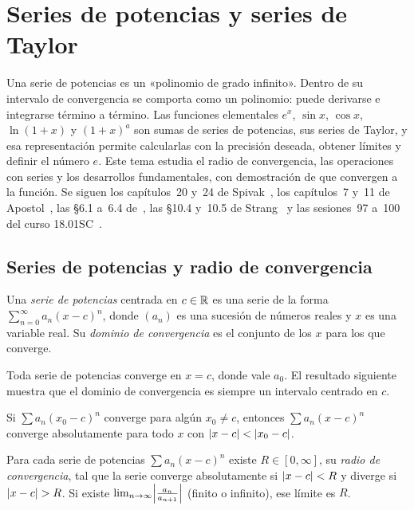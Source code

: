 \chapter{Series de potencias y series de Taylor}
\label{tema:6}

Una serie de potencias es un «polinomio de grado infinito». Dentro de su intervalo de convergencia se comporta como un polinomio: puede derivarse e integrarse término a término. Las funciones elementales $e^{x}$, $\sin x$, $\cos x$, $\ln(1+x)$ y $(1+x)^{a}$ son sumas de series de potencias, sus series de Taylor, y esa representación permite calcularlas con la precisión deseada, obtener límites y definir el número $e$. Este tema estudia el radio de convergencia, las operaciones con series y los desarrollos fundamentales, con demostración de que convergen a la función. Se siguen los capítulos~20 y~24 de Spivak~\cite{spivak}, los capítulos~7 y~11 de Apostol~\cite{apostol}, las §6.1 a~6.4 de~\cite{openstax2}, las §10.4 y~10.5 de Strang~\cite{strang} y las sesiones~97 a~100 del curso 18.01SC~\cite{mit1801}.

\section{Series de potencias y radio de convergencia}

\begin{definicion}\label{def:serie-potencias}
Una \emph{serie de potencias} centrada en $c\in\mathbb{R}$ es una serie de la forma $\sum_{n=0}^{\infty}a_n(x-c)^{n}$, donde $(a_n)$ es una sucesión de números reales y $x$ es una variable real. Su \emph{dominio de convergencia} es el conjunto de los $x$ para los que converge.
\end{definicion}

Toda serie de potencias converge en $x=c$, donde vale $a_0$. El resultado siguiente muestra que el dominio de convergencia es siempre un intervalo centrado en $c$.

\begin{lema}\label{lem:abel}
Si $\sum a_n(x_0-c)^{n}$ converge para algún $x_0\neq c$, entonces $\sum a_n(x-c)^{n}$ converge absolutamente para todo $x$ con $\lvert x-c\rvert<\lvert x_0-c\rvert$.
\end{lema}

\begin{teorema}\label{teo:radio}
Para cada serie de potencias $\sum a_n(x-c)^{n}$ existe $R\in[0,\infty]$, su \emph{radio de convergencia}, tal que la serie converge absolutamente si $\lvert x-c\rvert<R$ y diverge si $\lvert x-c\rvert>R$. Si existe $\lim_{n\to\infty}\Bigl|\frac{a_n}{a_{n+1}}\Bigr|$ (finito o infinito), ese límite es $R$.
\end{teorema}

